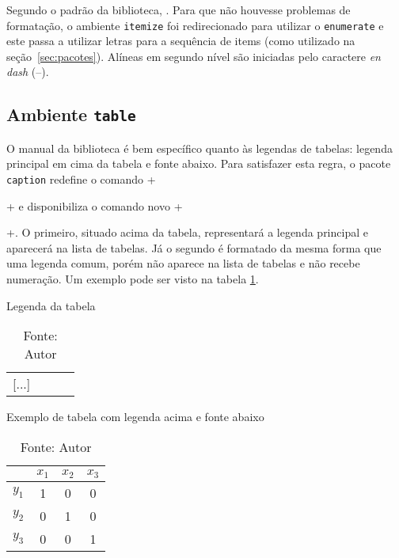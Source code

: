 \documentclass[xindy,rascunho]{fei}
\begin{document}
    Segundo o padrão da biblioteca, . Para que não houvesse problemas de formatação, o ambiente \texttt{itemize} foi redirecionado para utilizar o \texttt{enumerate} e este passa a utilizar letras para a sequência de items (como utilizado na seção~\ref{sec:pacotes}). Alíneas em segundo nível são iniciadas pelo caractere \emph{en dash} (--).
    
    \subsection{Ambiente \texttt{table}}

	O manual da biblioteca é bem específico quanto às legendas de tabelas: legenda principal em cima da tabela e fonte abaixo. Para satisfazer esta regra, o pacote \texttt{caption} redefine o comando \latexinline+\caption{}+ e disponibiliza o comando novo \latexinline+\caption*{}+. O primeiro, situado acima da tabela, representará a legenda principal e aparecerá na lista de tabelas. Já o segundo é formatado da mesma forma que uma legenda comum, porém não aparece na lista de tabelas e não recebe numeração. Um exemplo pode ser visto na tabela \ref{tbl:exemplo}.

\begin{latexcode}
\begin{table}[ht!]
	\caption{Legenda da tabela}
	\begin{tabular}{|c|c|c|c|}
		[...]
	\end{tabular}
	\caption*{Fonte: Autor}
\end{table}
\end{latexcode}

\begin{table}[ht!]
    \caption{Exemplo de tabela com legenda acima e fonte abaixo} \label{tbl:exemplo}
    \centering
    \begin{tabular}{|c|c|c|c|}
    \hline 
    & \(x_1\) & \(x_2\) & \(x_3\) \\ 
    \hline 
    \(y_1\) & 1 & 0 & 0 \\ 
    \hline 
    \(y_2\) & 0 & 1 & 0 \\ 
    \hline 
    \(y_3\) & 0 & 0 & 1 \\ 
    \hline 
    \end{tabular}
    \caption*{Fonte: Autor}
\end{table}
\end{document}
